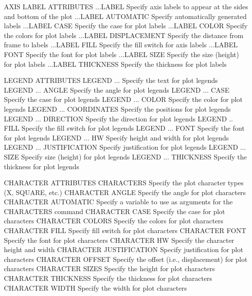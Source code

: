 AXIS LABEL ATTRIBUTES
   ...LABEL                   Specify axis labels to appear at the
                              sides and bottom of the plot
   ...LABEL AUTOMATIC         Specify automatically generated labels
   ...LABEL CASE              Specify the case for plot labels
   ...LABEL COLOR             Specify the colors for plot labels
   ...LABEL DISPLACEMENT      Specify the distance from frame to labels
   ...LABEL FILL              Specify the fill switch for axis labels
   ...LABEL FONT              Specify the font for plot labels
   ...LABEL SIZE              Specify the size (height) for plot labels
   ...LABEL THICKNESS         Specify the thickness for plot labels
 
LEGEND ATTRIBUTES
   LEGEND ...                 Specify the text for plot legends
   LEGEND ... ANGLE           Specify the angle for plot legends
   LEGEND ... CASE            Specify the case for plot legends
   LEGEND ... COLOR           Specify the color for plot legends
   LEGEND ... COORDINATES     Specify the positions for plot legends
   LEGEND ... DIRECTION       Specify the direction for plot legends
   LEGEND ..  FILL            Specify the fill switch for plot legends
   LEGEND ... FONT            Specify the font for plot legends
   LEGEND ... HW              Specify height and width for plot legends
   LEGEND ... JUSTIFICATION   Specify justification for plot legends
   LEGEND ... SIZE            Specify size (height) for plot legends
   LEGEND ... THICKNESS       Specify the thickness for plot legends
 
CHARACTER ATTRIBUTES
   CHARACTERS                 Specify the plot character types (X,
                              SQUARE, etc.)
   CHARACTER ANGLE            Specify the angle for plot characters
   CHARACTER AUTOMATIC        Specify a variable to use as arguments
                              for the CHARACTERS command
   CHARACTER CASE             Specify the case for plot characters
   CHARACTER COLORS           Specify the colors for plot characters
   CHARACTER FILL             Specify fill switch for plot characters
   CHARACTER FONT             Specify the font for plot characters
   CHARACTER HW               Specify the character height and width
   CHARACTER JUSTIFICATION    Specify justification for plot characters
   CHARACTER OFFSET           Specify the offset (i.e., displacement)
                              for plot characters
   CHARACTER SIZES            Specify the height for plot characters
   CHARACTER THICKNESS        Specify the thickness for plot characters
   CHARACTER WIDTH            Specify the width for plot characters
 
